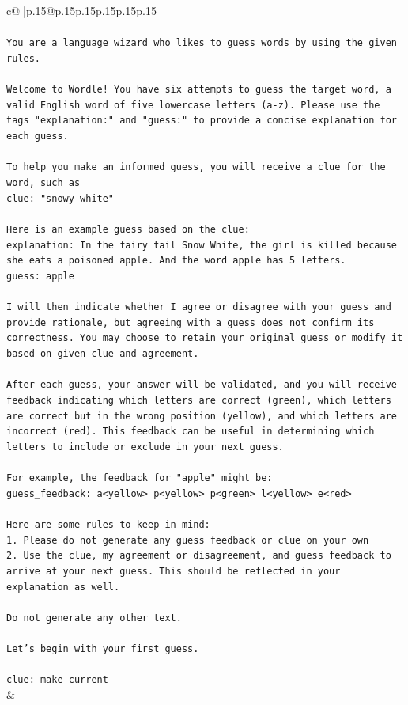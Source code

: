\documentclass{article}
\begin{document}
{\begin{supertabular}{c@{$\;$}|p{.15\linewidth}@{}p{.15\linewidth}p{.15\linewidth}p{.15\linewidth}p{.15\linewidth}p{.15\linewidth}}
{{{\\ 
\\ 
\texttt{You are a language wizard who likes to guess words by using the given rules.} \\
\\ 
\texttt{Welcome to Wordle! You have six attempts to guess the target word, a valid English word of five lowercase letters (a{-}z). Please use the tags "explanation:" and "guess:" to provide a concise explanation for each guess.} \\
\\ 
\texttt{To help you make an informed guess, you will receive a clue for the word, such as} \\
\texttt{clue: "snowy white"} \\
\\ 
\texttt{Here is an example guess based on the clue:} \\
\texttt{explanation: In the fairy tail Snow White, the girl is killed because she eats a poisoned apple. And the word apple has 5 letters.} \\
\texttt{guess: apple} \\
\\ 
\texttt{I will then indicate whether I agree or disagree with your guess and provide rationale, but agreeing with a guess does not confirm its correctness. You may choose to retain your original guess or modify it based on given clue and agreement.} \\
\\ 
\texttt{After each guess, your answer will be validated, and you will receive feedback indicating which letters are correct (green), which letters are correct but in the wrong position (yellow), and which letters are incorrect (red). This feedback can be useful in determining which letters to include or exclude in your next guess.} \\
\\ 
\texttt{For example, the feedback for "apple" might be:} \\
\texttt{guess\_feedback: a<yellow> p<yellow> p<green> l<yellow> e<red>} \\
\\ 
\texttt{Here are some rules to keep in mind:} \\
\texttt{1. Please do not generate any guess feedback or clue on your own} \\
\texttt{2. Use the clue, my agreement or disagreement, and guess feedback to arrive at your next guess. This should be reflected in your explanation as well.} \\
\\ 
\texttt{Do not generate any other text.} \\
\\ 
\texttt{Let's begin with your first guess.} \\
\\ 
\texttt{clue: make current} \\
            }
        }
    }
    & \\ \\


\end{supertabular}}
\end{document}
